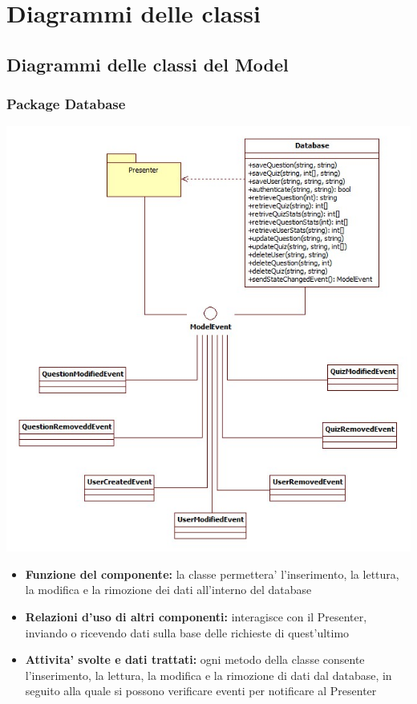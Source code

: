 \documentclass[a4paper,11pt]{article}
\begin{document}
	\section{Diagrammi delle classi}
		\subsection{Diagrammi delle classi del Model}
			\subsubsection{Package Database}
			\begin{center}
				\includegraphics[scale=0.6]{../images/Database.jpg}
			\end{center}
 			\begin{itemize}
		    	\item\textbf{Funzione del componente:} la classe permettera' l'inserimento, la lettura, la modifica e la rimozione dei dati all'interno del database
			\item\textbf{Relazioni d'uso di altri componenti:} interagisce con il Presenter, inviando o ricevendo dati sulla base delle richieste di quest'ultimo
			\item\textbf{Attivita' svolte e dati trattati:} ogni metodo della classe consente l'inserimento, la lettura, la modifica e la rimozione di dati dal database, in seguito alla quale si possono verificare eventi per notificare al Presenter
			\end{itemize}
\end{document}

